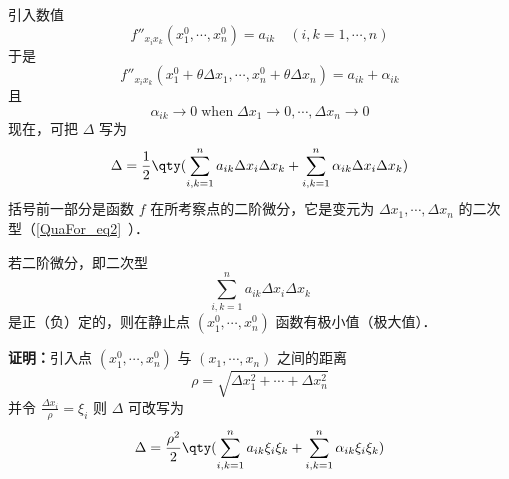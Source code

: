 引入数值
\begin{equation}
f''_{x_ix_k}(x_1^0,\cdots,x_n^0)=a_{ik}\quad (i,k=1,\cdots,n)
\end{equation}
于是
\begin{equation}
f''_{x_ix_k}(x_1^0+\theta\Delta x_1,\cdots,x_n^0+\theta\Delta x_n)=a_{ik}+\alpha_{ik}
\end{equation}
且
\begin{equation}
\alpha_{ik}\rightarrow 0\;\mathrm{when}\;\Delta x_1\rightarrow0,\cdots,\Delta x_n\rightarrow0
\end{equation}
现在，可把 $\Delta$ 写为
\begin{equation}
\Delta=\frac{1}{2}\qty(\sum_{i,k=1}^na_{ik}\Delta x_i\Delta x_k+\sum_{i,k=1}^n\alpha_{ik}\Delta x_i\Delta x_k )
\end{equation}
括号前一部分是函数 $f$ 在所考察点的二阶微分，它是变元为 $\Delta x_1,\cdots,\Delta x_n$ 的二次型（\autoref{QuaFor_eq2}~）．
\begin{theorem}{}
若二阶微分，即二次型
\begin{equation}
\sum_{i,k=1}^na_{ik}\Delta x_i\Delta x_k
\end{equation}
是正（负）定的，则在静止点 $(x_1^0,\cdots,x_n^0)$ 函数有极小值（极大值）．
\end{theorem}
\textbf{证明：}引入点 $(x_1^0,\cdots,x_n^0)$ 与 $(x_1,\cdots,x_n)$ 之间的距离
\begin{equation}
\rho=\sqrt{\Delta x_1^2+\cdots+\Delta x_n^2}
\end{equation}
 并令 $\frac{\Delta x_i}{\rho}=\xi_i$
 则 $\Delta$ 可改写为
 \begin{equation}
 \Delta=\frac{\rho^2}{2}\qty(\sum_{i,k=1}^na_{ik}\xi_i\xi_k+\sum_{i,k=1}^n\alpha_{ik} \xi_i\xi_k)
 \end{equation}
 